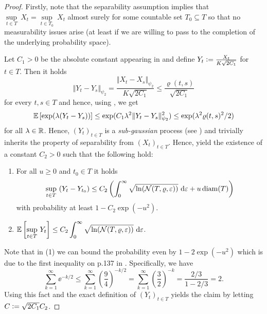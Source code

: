 \begin{proof}
Firstly, note that the separability assumption implies that $\underset{t \in T}{\sup} \ X_t = \underset{t \in T_0}{\sup} \ X_t$ almost surely for some countable set $T_0 \subseteq T$ so that no measurability issues arise (at least if we are willing to pass to the completion of the underlying probability space). 

Let $C_1 > 0$ be the absolute constant appearing in \cite[Equation (2.16)]{vershynin_high-dimensional_2018} and define $Y_t \mathrel{\mathop:}= \frac{X_t}{K \sqrt{2C_1}}$ for $t \in T$. Then it holds
\begin{equation*}
\Vert Y_t - Y_s \Vert_{\psi_2} = \frac{\Vert X_t - X_s \Vert_{\psi_2}}{K \sqrt{2C_1}} \leq \frac{\varrho(t,s)}{\sqrt{2C_1}}
\end{equation*}
for every $t,s \in T$ and hence, using \cite[Equation (2.16)]{vershynin_high-dimensional_2018}, we get
\begin{align*}
\mathbb{E} \left[ \exp(\lambda(Y_t - Y_s))\right] \leq \exp(C_1 \lambda^2 \Vert Y_t - Y_s\Vert_{\psi_2}^2) \leq \exp(\lambda^2 \varrho(t,s)^2/2)
\end{align*}
for all $\lambda \in \mathbb{R}$. Hence, $(Y_t)_{t \in T}$ is a \emph{sub-gaussian} process (see \cite[Definition 5.20]{van2014probability}) and trivially inherits the property of separability from $(X_t)_{t \in T}$. Hence, \cite[Theorems~5.25~and~5.29]{van2014probability} yield the existence of a constant $C_2>0$ such that the following hold:
\begin{enumerate}
\item{For all $u \geq 0$ and $t_0 \in T$ it holds 
\begin{equation*}
\underset{t \in T}{\sup} \ (Y_t - Y_{t_0}) \leq C_2 \left(\int_0^\infty \sqrt{\ln(\mathcal{N}(T, \varrho, \varepsilon))} \ \mathrm{d} \varepsilon + u \operatorname{diam}(T) \right)
\end{equation*}
with probability at least $1- C_2\exp(-u^2)$.}
\item{$ \displaystyle \mathbb{E} \left[\underset{t \in T}{\sup} \  Y_t \right] \leq C_2 \int_0^\infty \sqrt{\ln(\mathcal{N}(T, \varrho, \varepsilon))} \ \mathrm{d} \varepsilon $}.
\end{enumerate}
Note that in (1) we can bound the probability even by $1-2\exp(-u^2)$ which is due to the first inequality on p.137 in \cite{van2014probability}. Specifically, we have
\begin{equation*}
\sum_{k=1}^\infty \ee ^{-k /2} \leq \sum_{k=1}^\infty\left( \frac{9}{4} \right)^{-k/2} = \sum_{k=1}^\infty \left(\frac{3}{2}\right)^{-k} = \frac{2/3}{1- 2/3} = 2.
\end{equation*}
Using this fact and the exact definition of $(Y_t)_{t \in T}$ yields the claim by letting $C \mathrel{\mathop:}= \sqrt{2C_1}C_2$.
\end{proof}

